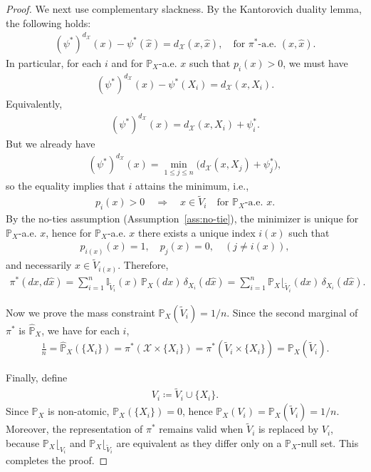 \documentclass{article}
\theoremstyle{plain}
\theoremstyle{definition}
\theoremstyle{remark}
\begin{document}
\begin{proof}
	We next use complementary slackness. By the Kantorovich duality lemma, the following holds:	
	\begin{align*}		
		(\psi^*)^{d_{\mathcal{X}}}(x) - \psi^*(\hat{x}) = d_{\mathcal{X}}(x,\hat{x}) , \quad\text{for }\pi^*\text{-a.e. }(x,\hat{x}).		
	\end{align*}	
	In particular, for each $i$ and for $\mathbb{P}_X$-a.e. $x$ such that $p_i(x)>0$, we must have	
	\begin{align*}		
		(\psi^*)^{d_{\mathcal{X}}}(x) - \psi^*(X_i) = d_{\mathcal{X}}(x,X_i).		
	\end{align*}	
	Equivalently,	
	\begin{align*}	
		(\psi^*)^{d_{\mathcal{X}}}(x) = d_{\mathcal{X}}(x,X_i) + \psi_i^*.		
	\end{align*}	
	But we already have	
	\begin{align*}		
		(\psi^*)^{d_{\mathcal{X}}}(x)=\min_{1 \leq j \leq n}\bigl(d_{\mathcal{X}}(x,X_j)+\psi_j^*\bigr),		
	\end{align*}	
	so the equality implies that $i$ attains the minimum, i.e.,	
	\begin{align*}		
		p_i(x)>0 \quad\Longrightarrow\quad x\in \tilde{V}_i \quad \text{for }\mathbb{P}_X\text{-a.e. }x.		
	\end{align*}	
	By the no-ties assumption (Assumption~\ref{ass:no-tie}), the minimizer is unique for $\mathbb{P}_X$-a.e. $x$, hence for $\mathbb{P}_X$-a.e. $x$ there exists a unique index $i(x)$ such that	
	\begin{align*}		
		p_{i(x)}(x)=1,\quad p_j(x)=0 , \quad (j\neq i(x)),		
	\end{align*}	
	and necessarily $x\in \tilde{V}_{i(x)}$. Therefore,	
	\begin{align*}		
		\pi^*(dx,d\hat{x}) = \sum_{i=1}^n \mathbb{I}_{\tilde{V}_i}(x)\,\mathbb{P}_X(dx)\,\delta_{X_i}(d\hat{x}) = \sum_{i=1}^n \mathbb{P}_X\lfloor_ {\tilde{V}_i}(dx)\,\delta_{X_i}(d\hat{x}) .		
	\end{align*}
	
	Now we prove the mass constraint $\mathbb{P}_X(\tilde{V}_i)=1/n$. Since the second marginal of $\pi^*$ is $\hat{\mathbb{P}}_X$, we have for each $i$,	
	\begin{align*}		
		\frac{1}{n} = \hat{\mathbb{P}}_X(\{X_i\}) = \pi^*(\mathcal{X}\times\{X_i\}) = \pi^*(\tilde{V}_i\times\{X_i\}) = \mathbb{P}_X(\tilde{V}_i) .		
	\end{align*}
	
	Finally, define	
	\begin{align*}		
		V_i \coloneqq \tilde{V}_i \cup \{X_i\}.		
	\end{align*}	
	Since $\mathbb{P}_X$ is non-atomic, $\mathbb{P}_X(\{X_i\})=0$, hence $\mathbb{P}_X(V_i)=\mathbb{P}_X(\tilde{V}_i)=1/n$. Moreover, the representation of $\pi^*$ remains valid when $\tilde{V}_i$ is replaced by $V_i$, because $\mathbb{P}_X \lfloor_{V_i}$ and $\mathbb{P}_X \lfloor_{\tilde{V}_i}$ are equivalent as they differ only on a $\mathbb{P}_X$-null set. This completes the proof.
\end{proof}
\end{document}
